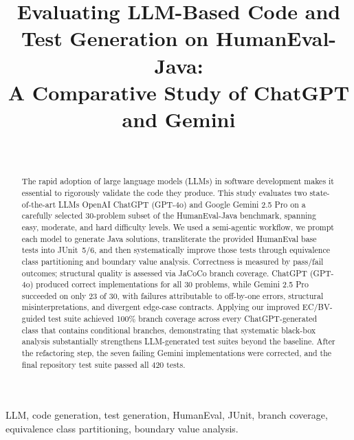 \documentclass[journal]{IEEEtran}
\begin{document}
\title{Evaluating LLM-Based Code and Test Generation on HumanEval-Java:\\
A Comparative Study of ChatGPT and Gemini}

\author{\\
}

\maketitle

\begin{abstract}
The rapid adoption of large language models (LLMs) in software development
makes it essential to rigorously validate the code they produce. This study
evaluates two state-of-the-art LLMs OpenAI ChatGPT (GPT-4o) and Google
Gemini 2.5 Pro on a carefully selected 30-problem subset of the
HumanEval-Java benchmark, spanning easy, moderate, and hard difficulty levels.
We used a semi-agentic workflow, we prompt each model to generate Java solutions,
transliterate the provided HumanEval base tests into JUnit~5/6, and then
systematically improve those tests through equivalence class partitioning and
boundary value analysis. Correctness is measured by pass/fail outcomes;
structural quality is assessed via JaCoCo branch coverage. ChatGPT (GPT-4o)
produced correct implementations for all 30 problems, while Gemini 2.5 Pro
succeeded on only 23 of 30, with failures attributable to off-by-one errors,
structural misinterpretations, and divergent edge-case contracts. Applying our
improved EC/BV-guided test suite achieved 100\% branch coverage across every
ChatGPT-generated class that contains conditional branches, demonstrating that
systematic black-box analysis substantially strengthens LLM-generated test
suites beyond the baseline. After the refactoring step, the seven failing
Gemini implementations were corrected, and the final repository test suite
passed all 420 tests.
\end{abstract}

\begin{IEEEkeywords}
LLM, code generation, test generation, HumanEval, JUnit, branch coverage,
equivalence class partitioning, boundary value analysis.
\end{IEEEkeywords}
\end{document}
